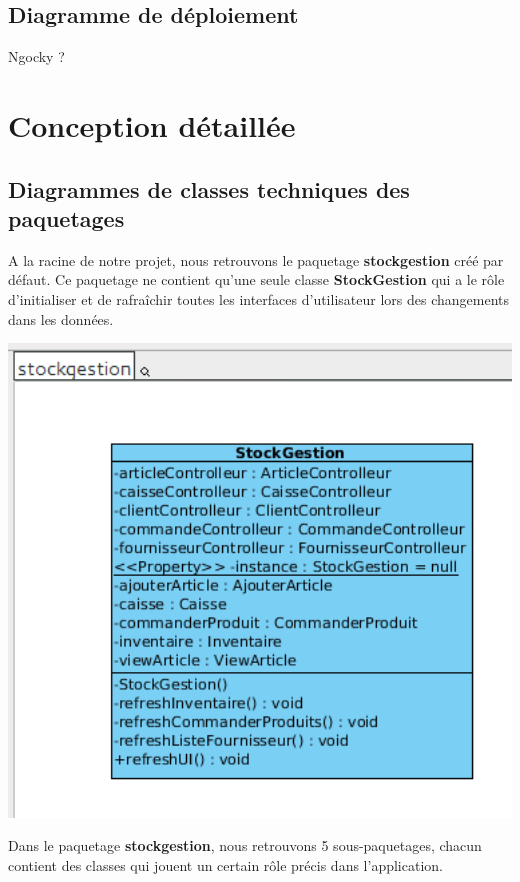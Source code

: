 \section{Diagramme de déploiement}

Ngocky ?


\chapter{Conception détaillée}

\section{Diagrammes de classes techniques des paquetages}

A la racine de notre projet, nous retrouvons le paquetage \textbf{stockgestion} créé par défaut. Ce paquetage ne contient qu'une seule classe \textbf{StockGestion} qui a le rôle d'initialiser et de rafraîchir toutes les interfaces d'utilisateur lors des changements dans les données.

\begin{center}
\includegraphics[width=14cm]{./Conception/stockgestion}
\end{center}

Dans le paquetage \textbf{stockgestion}, nous retrouvons 5 sous-paquetages, chacun contient des classes qui jouent un certain rôle précis dans l'application.\\

